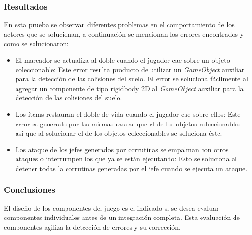 \subsubsection{Resultados}
En esta prueba se observan diferentes problemas en el comportamiento de los actores
que se solucionan, a continuación se mencionan los errores encontrados y como se
solucionaron:
        \begin{itemize}
                \item El marcador se actualiza al doble cuando el jugador cae
                sobre un objeto coleccionable: Este error resulta producto de
                utilizar un \textit{GameObject} auxiliar para la detección de las
                colisiones del suelo. El error se soluciona fácilmente al agregar
                un componente de tipo rigidbody 2D al \textit{GameObject} auxiliar
                para la detección de las colisiones del suelo.
                \item Los ítems restauran el doble de vida cuando el jugador cae
                sobre ellos: Este error es generado por las mismas causas que el
                de los objetos coleccionables así que al solucionar el de los
                objetos coleccionables se soluciona éste.
                \item Los ataque de los jefes generados por corrutinas se
                empalman con otros ataques o interrumpen los que ya se están
                ejecutando: Esto se soluciona al detener todas la corrutinas generadas
                por el jefe cuando se ejecuta un ataque.
        \end{itemize}

\subsubsection{Conclusiones}
El diseño de los componentes del juego es el indicado si se desea evaluar 
componentes individuales antes de un integración completa. Esta evaluación 
de componentes agiliza la detección de errores y su corrección.